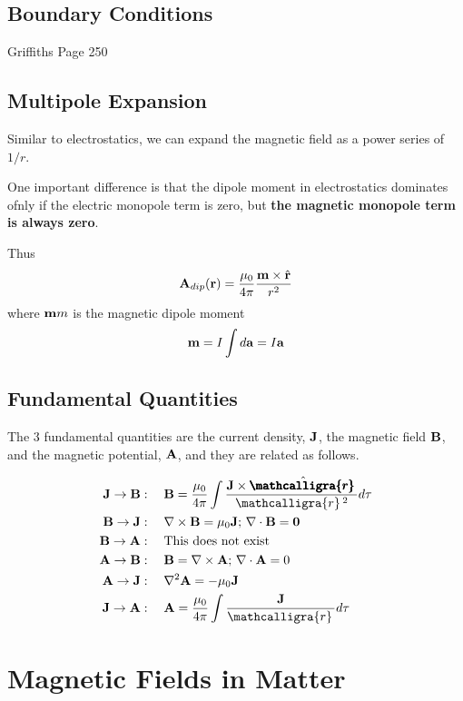 \documentclass{article}
\newcommand{\scriptr}{\mathcalligra{r}\,}
\newcommand{\boldscriptr}{\pmb{\mathcalligra{r}}\,}
\newcommand{\vh}[1]{\hat{\vb{#1}}}
\begin{document}
\subsection{Boundary Conditions}
Griffiths Page 250

\subsection{Multipole Expansion}
Similar to electrostatics, we can expand the magnetic field as a power series of $1/r$. 

One important difference is that the dipole moment in electrostatics dominates ofnly if the electric monopole term is zero, but \textbf{the magnetic monopole term is always zero}.

Thus
$$
\vb{A}_{dip} (\vb{r}) = \frac{\mu_0}{4\pi} \frac{\vb{m}\times\vh{r}}{r^2}
$$
where $\vb{m}m$ is the magnetic dipole moment
$$
\vb{m} = I \int d\vb{a} = I\vb{a}
$$

\subsection{Fundamental Quantities}
The 3 fundamental quantities are the current density, $\vb{J}$, the magnetic field $\vb{B}$, and the magnetic potential, $\vb{A}$, and they are related as follows.

\begin{align*}
    \vb{J} \to \vb{B} & :\quad \vb{B} = \frac{\mu_0}{4\pi} \int \frac{\vb{J} \times \hat{\boldscriptr}}{\scriptr^2} d\tau \\
    \vb{B} \to \vb{J} & :\quad \nabla \times \vb{B} = \mu_0 \vb{J}; \, \nabla \cdot \vb{B} = \vb{0} \\
    \vb{B} \to \vb{A} & : \quad \text{This does not exist} \\
    \vb{A} \to \vb{B} & :\quad \vb{B} = \nabla \times \vb{A}; \, \nabla \cdot \vb{A} = 0 \\
    \vb{A} \to \vb{J} & :\quad \nabla^2 \vb{A} = -\mu_0 \vb{J}\\
    \vb{J} \to \vb{A} & :\quad \vb{A} = \frac{\mu_0}{4\pi} \int \frac{\vb{J}}{\scriptr} d\tau
\end{align*}

\section{Magnetic Fields in Matter}
\end{document}
